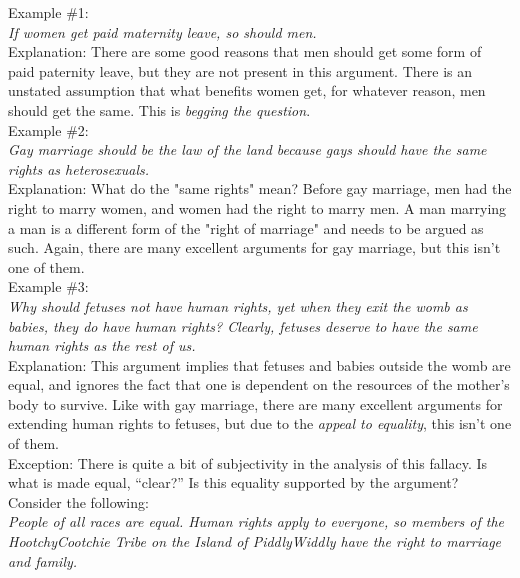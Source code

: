 \documentclass[a4paper,12pt,single,pdftex]{scrartcl}
\begin{document}
    
      Example \#1:
    \\

    
      {\em If women get paid maternity leave, so should men.}
    \\

    
      Explanation: There are some good reasons that men should get some form of paid paternity leave, but they are not present in this argument. There is an unstated assumption that what benefits women get, for whatever reason, men should get the same. This is {\it begging the question}.
    \\

    
      Example \#2:
    \\

    
      {\em Gay marriage should be the law of the land because gays should have the same rights as heterosexuals.}
    \\

    
      Explanation: What do the "same rights" mean? Before gay marriage, men had the right to marry women, and women had the right to marry men. A man marrying a man is a different form of the "right of marriage" and needs to be argued as such. Again, there are many excellent arguments for gay marriage, but this isn't one of them.
    \\

    
      Example \#3:
    \\

    
      {\em Why should fetuses not have human rights, yet when they exit the womb as babies, they do have human rights? Clearly, fetuses deserve to have the same human rights as the rest of us.}
    \\

    
      Explanation: This argument implies that fetuses and babies outside the womb are equal, and ignores the fact that one is dependent on the resources of the mother's body to survive. Like with gay marriage, there are many excellent arguments for extending human rights to fetuses, but due to the {\it appeal to equality}, this isn't one of them.
    \\

    
      Exception: There is quite a bit of subjectivity in the analysis of this fallacy. Is what is made equal, “clear?” Is this equality supported by the argument? Consider the following:
    \\

    
      {\em People of all races are equal. Human rights apply to everyone, so members of the HootchyCootchie Tribe on the Island of PiddlyWiddly have the right to marriage and family.}
    \\
\end{document}
